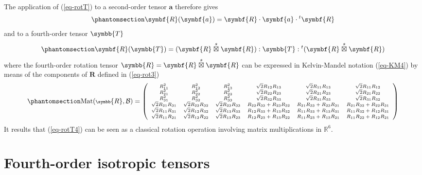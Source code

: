 \documentclass[
  a4paper,
  numbers=noendperiod,
  DIV=12]{scrreprt}
\newcommand{\R}{{\mathbb{{R}}}}
\newcommand{\uu}[1]{{\symbf{{#1}}}}
\newcommand{\uuuu}[1]{{\symbb{{#1}}}}
\newcommand{\trans}[1]{{{}^{t}{#1}}}
\newcommand{\sboxtimes}{\stackrel{s}{\boxtimes}}
\DeclareMathOperator{\Mat}{Mat}
\begin{document}
The application of (\ref{eq-rotT}) to a second-order tensor \(\uu{a}\)
therefore gives \begin{equation}\protect\phantomsection\label{eq-rotT2}{
\uu{R}(\uu{a})=\uu{R}\cdot 
\uu{a}
\cdot\trans{\uu{R}}
}\end{equation} and to a fourth-order tensor \(\uuuu{T}\)
\begin{equation}\protect\phantomsection\label{eq-rotT4}{
\uu{R}(\uuuu{T})=(\uu{R}\sboxtimes\uu{R}):
\uuuu{T}
:\trans{(\uu{R}\sboxtimes\uu{R})}
}\end{equation} where the fourth-order rotation tensor
\(\uuuu{R}=\uu{R}\sboxtimes\uu{R}\) can be expressed in Kelvin-Mandel
notation (\ref{eq-KM4}) by means of the components of \(\uu{R}\) defined
in (\ref{eq-rot3})
\begin{equation}\protect\phantomsection\label{eq-rot6}{
\scriptsize
\Mat(\uuuu{R},\mathcal{B})=
   \left(
\begin{array}{cccccc}
R_{1 1}^{2} & R_{1 2}^{2} & R_{1 3}^{2} & \sqrt{2}  R_{1 2}  R_{1 3} & \sqrt{2}  R_{1 1}  R_{1 3} & \sqrt{2}  R_{1 1}  R_{1 2} \\
R_{2 1}^{2} & R_{2 2}^{2} & R_{2 3}^{2} & \sqrt{2}  R_{2 2}  R_{2 3} & \sqrt{2}  R_{2 1}  R_{2 3} & \sqrt{2}  R_{2 1}  R_{2 2} \\
R_{3 1}^{2} & R_{3 2}^{2} & R_{3 3}^{2} & \sqrt{2}  R_{3 2}  R_{3 3} & \sqrt{2}  R_{3 1}  R_{3 3} & \sqrt{2}  R_{3 1}  R_{3 2} \\
\sqrt{2}  R_{2 1}  R_{3 1} & \sqrt{2}  R_{2 2}  R_{3 2} & \sqrt{2}  R_{2 3}  R_{3 3} & R_{2 2}  R_{3 3} + R_{2 3}  R_{3 2} & R_{2 1}  R_{3 3} + R_{2 3}  R_{3 1} & R_{2 1}  R_{3 2} + R_{2 2}  R_{3 1} \\
\sqrt{2}  R_{1 1}  R_{3 1} & \sqrt{2}  R_{1 2}  R_{3 2} & \sqrt{2}  R_{1 3}  R_{3 3} & R_{1 2}  R_{3 3} + R_{1 3}  R_{3 2} & R_{1 1}  R_{3 3} + R_{1 3}  R_{3 1} & R_{1 1}  R_{3 2} + R_{1 2}  R_{3 1} \\
\sqrt{2}  R_{1 1}  R_{2 1} & \sqrt{2}  R_{1 2}  R_{2 2} & \sqrt{2}  R_{1 3}  R_{2 3} & R_{1 2}  R_{2 3} + R_{1 3}  R_{2 2} & R_{1 1}  R_{2 3} + R_{1 3}  R_{2 1} & R_{1 1}  R_{2 2} + R_{1 2}  R_{2 1} \\
\end{array}
\right)
}\end{equation} It results that (\ref{eq-rotT4}) can be seen as a
classical rotation operation involving matrix multiplications in
\(\R^6\).

\section{Fourth-order isotropic tensors}\label{sec-ISO}
\end{document}
